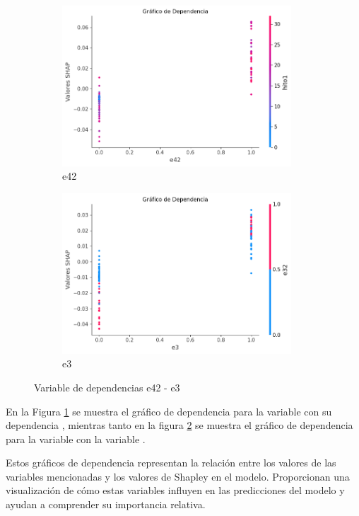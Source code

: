 \begin{figure}[H]

    \begin{subfigure}{0.5\textwidth}
        \includegraphics[width=0.9\linewidth, height=6cm]{img/shap_rf/e42.png}
        \caption{e42}
        \label{fig:dependencia_e42}
    \end{subfigure}
    \begin{subfigure}{0.5\textwidth}
        \includegraphics[width=0.9\linewidth, height=6cm]{img/shap_rf/e3.png}
        \caption{e3}
        \label{fig:dependencia_e3}
    \end{subfigure}

    \caption{Variable de dependencias e42 - e3}
    \label{fig:image2}
\end{figure}

En la Figura \ref{fig:dependencia_e42} se muestra el gráfico de dependencia para la variable  con su dependencia , mientras tanto en la figura \ref{fig:dependencia_e3} se muestra el gráfico de dependencia para la variable  con la variable .

Estos gráficos de dependencia representan la relación entre los valores de las variables mencionadas y los valores de Shapley en el modelo. Proporcionan una visualización de cómo estas variables influyen en las predicciones del modelo y ayudan a comprender su importancia relativa.

